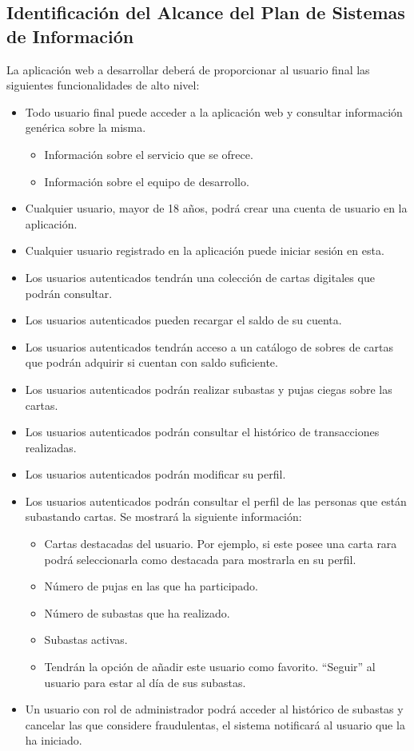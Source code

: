 \subsection{Identificación del Alcance del Plan de Sistemas de Información} \hypertarget{sec:2_identificacion_alcance_PSI}{}
La aplicación web a desarrollar deberá de proporcionar al usuario final las siguientes funcionalidades de alto nivel:
\begin{itemize}
    \item Todo usuario final puede acceder a la aplicación web y consultar información genérica sobre la misma.
    \begin{itemize}
        \item Información sobre el servicio que se ofrece.
        \item Información sobre el equipo de desarrollo.
    \end{itemize}
    \item Cualquier usuario, mayor de 18 años, podrá crear una cuenta de usuario en la aplicación.
    \item Cualquier usuario registrado en la aplicación puede iniciar sesión en esta.
    \item Los usuarios autenticados tendrán una colección de cartas digitales que podrán consultar.
    \item Los usuarios autenticados pueden recargar el saldo de su cuenta.
    \item Los usuarios autenticados tendrán acceso a un catálogo de sobres de cartas que podrán adquirir si cuentan con saldo suficiente.
    \item Los usuarios autenticados podrán realizar subastas y pujas ciegas sobre las cartas.
    \item Los usuarios autenticados podrán consultar el histórico de transacciones realizadas.
    \item Los usuarios autenticados podrán modificar su perfil.
    \item Los usuarios autenticados podrán consultar el perfil de las personas que están subastando cartas. Se mostrará la siguiente información:
    \begin{itemize}
        \item Cartas destacadas del usuario. Por ejemplo, si este posee una carta rara podrá seleccionarla como destacada para mostrarla en su perfil.
        \item Número de pujas en las que ha participado.
        \item Número de subastas que ha realizado.
        \item Subastas activas.
        \item Tendrán la opción de añadir este usuario como favorito. ``Seguir'' al usuario para estar al día de sus subastas.
    \end{itemize}
    \item Un usuario con rol de administrador podrá acceder al histórico de subastas y cancelar las que considere fraudulentas, el sistema notificará al usuario que la ha iniciado.
\end{itemize}

